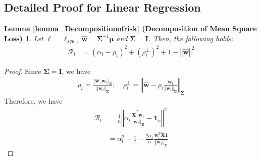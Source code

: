 \documentclass[pdflatex,sn-basic]{sn-jnl}%
\theoremstyle{thmstyleone}%
\begin{document}
\begin{appendices}
\section{Detailed Proof for Linear Regression}\label{Detailed_Proof_for_Linear_Regression}

\newtheorem*{restate_lemma_Decompositionofrisk}{Lemma \ref{lemma_Decompositionofrisk} (Decomposition of Mean Square Loss)}
\begin{shaded}
  \begin{restate_lemma_Decompositionofrisk}
    Let $\ell = \ell_{squ}$, $\hat{\mathbf{w}} = \mathbf{\Sigma}^{-1} \boldsymbol{\mu}$ and $\mathbf{\Sigma} = \mathbf{I}$. 
    Then, the following holds:
    \begin{equation*}
    \begin{aligned}
      \mathcal{R}_t & = 
      (\alpha_t - \rho_t)^{2} + (\rho_t^{\perp})^2 + 
      1 - \left\Vert \hat{\mathbf{w}} \right\Vert^{2}
    \end{aligned}
    \end{equation*}
  \end{restate_lemma_Decompositionofrisk}
\end{shaded}
\begin{proof}
  Since $\mathbf{\Sigma} = \mathbf{I}$, we have 
  \begin{equation*}
  \begin{aligned}
    \rho_t = \frac{\langle \hat{\mathbf{w}}, \mathbf{w}_t \rangle_\mathbf{\Sigma}}{\Vert \mathbf{w}_t \Vert_{\mathbf{\Sigma}}};
    \quad 
    \rho_t^{\perp} = \left\Vert
    \hat{\mathbf{w}} - \rho_t \frac{\mathbf{w}_t}{\Vert \mathbf{w}_t \Vert_\mathbf{\Sigma}}
  \right\Vert_{\mathbf{\Sigma}}
  \end{aligned}
  \end{equation*}
  Therefore, we have
  \begin{equation*}
  \begin{aligned}
    \mathcal{R}_t & = 
    \frac{1}{n} \left\Vert \alpha_t \frac{\tilde{\mathbf{X}}^{T} \mathbf{w}_t}{
      \left\Vert \mathbf{w}_t \right\Vert_{\mathbf{\Sigma}}
    } - \mathbf{1}_{n} \right\Vert^{2}
    \\ & =
    \alpha_t^{2} + 1 - \frac{2\alpha_t}{n} \frac{\mathbf{w}_t^{T} \tilde{\mathbf{X}} \mathbf{1}}{\left\Vert \mathbf{w}_t \right\Vert_{\mathbf{\Sigma}}}

\end{aligned}
\end{equation*}
\end{proof}
\end{appendices}
\end{document}
